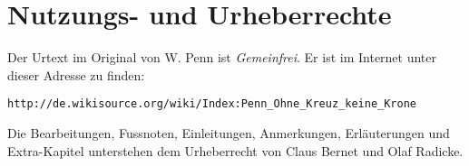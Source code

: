 \chapter{Nutzungs- und Urheberrechte}
Der Urtext im Original von W. Penn ist \textit{Gemeinfrei}. Er ist im Internet
unter dieser Adresse zu finden:

\begin{center}
\texttt{http://de.wikisource.org/wiki/Index:Penn\_Ohne\_Kreuz\_keine\_Krone}
\end{center}

Die Bearbeitungen, Fussnoten, Einleitungen, Anmerkungen, Erläuterungen und
Extra-Kapitel unterstehen dem Urheberrecht von Claus Bernet und Olaf Radicke.






